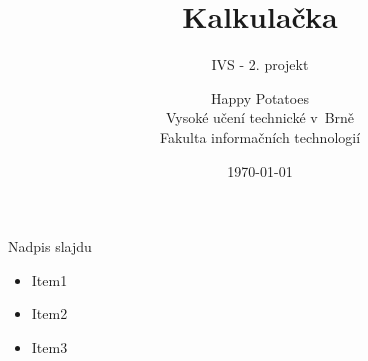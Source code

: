 \documentclass{beamer}{
\usetheme{default}
\setbeamercovered{transparent}
\setbeamertemplate{navigation symbols}{}
}
\begin{document}
\begin{frame}
\title{Kalkulačka}
\subtitle{IVS - 2. projekt}
\author{Happy Potatoes \medskip\\Vysoké učení technické v~Brně\\Fakulta informačních technologií}
\date{\today}
\maketitle
\end{frame}
\begin{frame}{\quad Nadpis slajdu}
\begin{itemize}
\item Item1
\item Item2
\item Item3
\end{itemize}

\end{frame}
\end{document}
